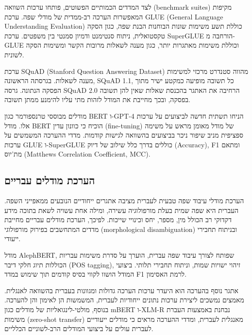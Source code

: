 לצד המדדים הכמותיים הפשוטים, פותחו ערכות השוואה (benchmark suites)
מקיפות המאפשרות הערכה רב-ממדית של מודלי שפה. ערכת GLUE (General Language
Understanding Evaluation) כוללת תשע משימות שונות הבוחנות הבנת שפה, כגון
הסקה טקסטואלית, ניתוח סנטימנט ודמיון סמנטי בין משפטים. ערכת SuperGLUE
הורחבה מ-GLUE וכוללת משימות מאתגרות יותר, כגון מענה לשאלות מרובות הקשר
ומשימות הסקה לשונית.

ערכת SQuAD (Stanford Question Answering Dataset) מהווה סטנדרט מרכזי
למשימות מענה לשאלות. בגרסתה הראשונה, SQuAD 1.1, כל תשובה מופיעה כמקטע
ישיר מתוך הפסקה הנתונה. גרסה SQuAD 2.0 הרחיבה את האתגר בהכנסת שאלות שאין
להן תשובה בפסקה, ובכך מחייבת את המודל לזהות מתי עליו להימנע ממתן תשובה.

מודלים מבוססי טרנספורמר כגון BERT ו-GPT-4 הניחו תשתית חדשה לביצועים על
ערכות אלו. מודל BERT הוכיח כי כוונון עדין (fine-tuning) של מודל מאומן
מראש על משימה ספציפית מניב שיפור ניכר בביצועים בהשוואה לגישות קודמות.
מדדי ההערכה המשמשים על ערכות GLUE ו-SuperGLUE כוללים בדרך כלל שילוב של
דיוק (Accuracy), F1 ומתאם מת'יוס (Matthews Correlation Coefficient,
MCC).

\hypertarget{ux5d4ux5e2ux5e8ux5dbux5ea-ux5deux5d5ux5d3ux5dcux5d9ux5dd-ux5e2ux5d1ux5e8ux5d9ux5d9ux5dd}{%
\subsection{הערכת מודלים
עבריים}\label{ux5d4ux5e2ux5e8ux5dbux5ea-ux5deux5d5ux5d3ux5dcux5d9ux5dd-ux5e2ux5d1ux5e8ux5d9ux5d9ux5dd}}

הערכת מודלי עיבוד שפה טבעית לעברית מציבה אתגרים ייחודיים הנובעים
ממאפייני השפה. העברית היא שפה שמית בעלת מורפולוגיה עשירה, ומילה אחת
עשויה לשאת בתוכה מידע דקדוקי רב הכולל מין, מספר, יחס וכינויי שייכות.
לפיכך, הערכת מודלים עבריים מחייבת מדדים המתחשבים בפירוק מורפולוגי
(morphological disambiguation) ובניתוח תחבירי ייעודי.

מודל AlephBERT, שפותח לצורך עיבוד שפה עברית, הוערך על סדרת משימות עבריות
הכוללות תיוג חלקי דיבר (POS tagging), זיהוי ישויות שמות, וניתוח תחבירי
תלותי. ביצועי המודל הושוו לקווי בסיס קודמים תוך שימוש במדד F1 לרמת
האסימון.

אתגר נוסף בהערכה הוא היעדר ערכות הערכה גדולות ומגוונות בעברית בהשוואה
לאנגלית. מאמצים נמשכים ליצירת ערכות נתונים ייחודיות לעברית, המשמשות הן
לאימון והן להערכה. בנוסף, מולטי-לינגואליות של מודלים כגון mBERT ו-XLM-R
נבחנת באמצעות העברת משימות (zero-shot transfer) מאנגלית לעברית, ומדדי
ההערכה מראים כי מודלים ייעודיים לעברית עולים על ביצועי המודלים
הרב-לשוניים הכלליים.
